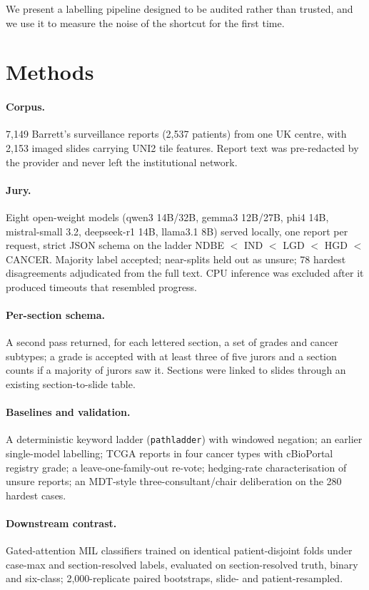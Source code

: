 We present a labelling pipeline designed to be audited rather than trusted, and we use it to measure the noise of the shortcut for the first time.

\section{Methods}
\paragraph{Corpus.} 7,149 Barrett's surveillance reports (2,537 patients) from one UK centre, with 2,153 imaged slides carrying UNI2 tile features. Report text was pre-redacted by the provider and never left the institutional network.

\paragraph{Jury.} Eight open-weight models (qwen3 14B/32B, gemma3 12B/27B, phi4 14B, mistral-small 3.2, deepseek-r1 14B, llama3.1 8B) served locally, one report per request, strict JSON schema on the ladder NDBE $<$ IND $<$ LGD $<$ HGD $<$ CANCER. Majority label accepted; near-splits held out as unsure; 78 hardest disagreements adjudicated from the full text. CPU inference was excluded after it produced timeouts that resembled progress.

\paragraph{Per-section schema.} A second pass returned, for each lettered section, a set of grades and cancer subtypes; a grade is accepted with at least three of five jurors and a section counts if a majority of jurors saw it. Sections were linked to slides through an existing section-to-slide table.

\paragraph{Baselines and validation.} A deterministic keyword ladder (\texttt{pathladder}) with windowed negation; an earlier single-model labelling; TCGA reports in four cancer types with cBioPortal registry grade; a leave-one-family-out re-vote; hedging-rate characterisation of unsure reports; an MDT-style three-consultant/chair deliberation on the 280 hardest cases.

\paragraph{Downstream contrast.} Gated-attention MIL classifiers trained on identical patient-disjoint folds under case-max and section-resolved labels, evaluated on section-resolved truth, binary and six-class; 2,000-replicate paired bootstraps, slide- and patient-resampled.

